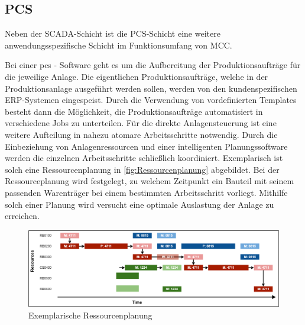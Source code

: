 \subsection{PCS\label{subsec3.1.4:Unterunterpunkt-4}}

Neben der \glqq SCADA\grqq{}-Schicht ist die \glqq PCS\grqq{}-Schicht eine weitere anwendungsspezifische Schicht im Funktionsumfang von MCC.

Bei einer \gls{pcs} - Software geht es um die Aufbereitung der Produktionsaufträge für die jeweilige Anlage. Die eigentlichen Produktionsaufträge, welche in der Produktionsanlage ausgeführt werden sollen, werden von den kundenspezifischen ERP-Systemen eingespeist. Durch die Verwendung von vordefinierten Templates besteht dann die Möglichkeit, die Produktionsaufträge automatisiert in verschiedene Jobs zu unterteilen. Für die direkte Anlagensteuerung ist eine weitere Aufteilung in nahezu atomare Arbeitsschritte notwendig. Durch die Einbeziehung von Anlagenressourcen und einer intelligenten Planungssoftware werden die einzelnen Arbeitsschritte schließlich koordiniert. Exemplarisch ist solch eine Ressourcenplanung in \autoref{fig:Ressourcenplanung} abgebildet. Bei der Ressourceplanung wird festgelegt, zu welchem Zeitpunkt ein Bauteil mit seinem passenden Warenträger bei einem bestimmten Arbeitsschritt vorliegt. Mithilfe solch einer Planung wird versucht eine optimale Auslastung der Anlage zu erreichen.

\begin{figure}[H]
    \centering
    \includegraphics[width=0.9\linewidth]{images/Ressourcenplanung.png}
    \caption{Exemplarische Ressourcenplanung \cite{EniscobyForcamGmbH.2021}\protect\footnotemark}
    \label{fig:Ressourcenplanung}
\end{figure}


